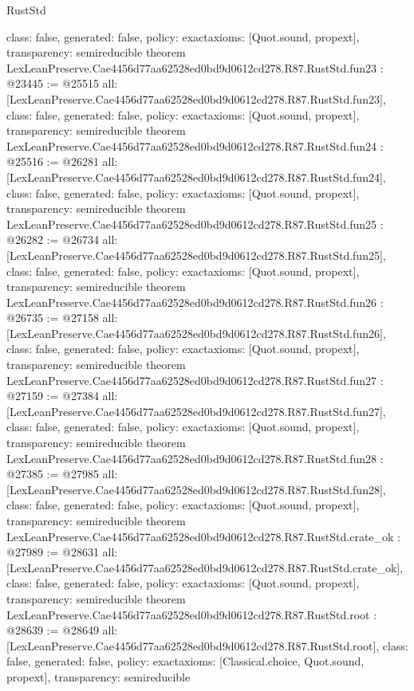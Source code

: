 \begin{lexlean}{RustStd}
\begin{coremodule}
{  class: false,
  generated: false,
  policy: exact{axioms: [Quot.sound, propext]},
  transparency: semireducible
}
theorem LexLeanPreserve.Cae4456d77aa62528ed0bd9d0612cd278.R87.RustStd.fun23 : @23445 := @25515 {
  all: [LexLeanPreserve.Cae4456d77aa62528ed0bd9d0612cd278.R87.RustStd.fun23],
  class: false,
  generated: false,
  policy: exact{axioms: [Quot.sound, propext]},
  transparency: semireducible
}
theorem LexLeanPreserve.Cae4456d77aa62528ed0bd9d0612cd278.R87.RustStd.fun24 : @25516 := @26281 {
  all: [LexLeanPreserve.Cae4456d77aa62528ed0bd9d0612cd278.R87.RustStd.fun24],
  class: false,
  generated: false,
  policy: exact{axioms: [Quot.sound, propext]},
  transparency: semireducible
}
theorem LexLeanPreserve.Cae4456d77aa62528ed0bd9d0612cd278.R87.RustStd.fun25 : @26282 := @26734 {
  all: [LexLeanPreserve.Cae4456d77aa62528ed0bd9d0612cd278.R87.RustStd.fun25],
  class: false,
  generated: false,
  policy: exact{axioms: [Quot.sound, propext]},
  transparency: semireducible
}
theorem LexLeanPreserve.Cae4456d77aa62528ed0bd9d0612cd278.R87.RustStd.fun26 : @26735 := @27158 {
  all: [LexLeanPreserve.Cae4456d77aa62528ed0bd9d0612cd278.R87.RustStd.fun26],
  class: false,
  generated: false,
  policy: exact{axioms: [Quot.sound, propext]},
  transparency: semireducible
}
theorem LexLeanPreserve.Cae4456d77aa62528ed0bd9d0612cd278.R87.RustStd.fun27 : @27159 := @27384 {
  all: [LexLeanPreserve.Cae4456d77aa62528ed0bd9d0612cd278.R87.RustStd.fun27],
  class: false,
  generated: false,
  policy: exact{axioms: [Quot.sound, propext]},
  transparency: semireducible
}
theorem LexLeanPreserve.Cae4456d77aa62528ed0bd9d0612cd278.R87.RustStd.fun28 : @27385 := @27985 {
  all: [LexLeanPreserve.Cae4456d77aa62528ed0bd9d0612cd278.R87.RustStd.fun28],
  class: false,
  generated: false,
  policy: exact{axioms: [Quot.sound, propext]},
  transparency: semireducible
}
theorem LexLeanPreserve.Cae4456d77aa62528ed0bd9d0612cd278.R87.RustStd.crate_ok : @27989 := @28631 {
  all: [LexLeanPreserve.Cae4456d77aa62528ed0bd9d0612cd278.R87.RustStd.crate_ok],
  class: false,
  generated: false,
  policy: exact{axioms: [Quot.sound, propext]},
  transparency: semireducible
}
theorem LexLeanPreserve.Cae4456d77aa62528ed0bd9d0612cd278.R87.RustStd.root : @28639 := @28649 {
  all: [LexLeanPreserve.Cae4456d77aa62528ed0bd9d0612cd278.R87.RustStd.root],
  class: false,
  generated: false,
  policy: exact{axioms: [Classical.choice, Quot.sound, propext]},
  transparency: semireducible
}


\end{coremodule}
\end{lexlean}
